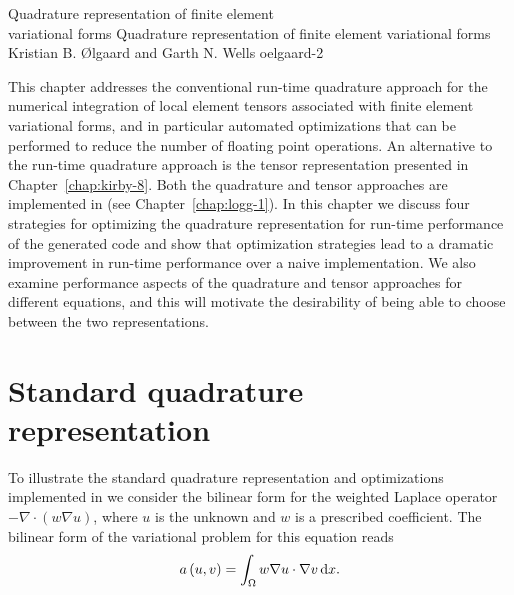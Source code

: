 \setcounter{chapter}{6}
              {Quadrature representation of finite element \\ variational forms}
              {Quadrature representation of finite element variational forms}
              {Kristian B. \O{}lgaard and Garth N. Wells}
              {oelgaard-2}

This chapter addresses the conventional run-time quadrature approach
for the numerical integration of local element tensors associated with
finite element variational forms, and in particular automated
optimizations that can be performed to reduce the number of floating
point operations. An alternative to the run-time quadrature approach
is the tensor representation presented in Chapter~\ref{chap:kirby-8}.
Both the quadrature and tensor approaches are implemented in \ffc{}
(see Chapter~\ref{chap:logg-1}).  In this chapter we discuss four
strategies for optimizing the quadrature representation for run-time
performance of the generated code and show that optimization
strategies lead to a dramatic improvement in run-time performance over
a naive implementation.  We also examine performance aspects of the
quadrature and tensor approaches for different equations, and this
will motivate the desirability of being able to choose between the two
representations.

\section{Standard quadrature representation}
\label{oelgaard-2:sec:standard_quadrature_representation}

To illustrate the standard quadrature representation  and optimizations implemented in \ffc{} we consider
the bilinear form for the weighted Laplace operator $-\nabla \cdot (w
\nabla u)$, where $u$ is the unknown and $w$ is a prescribed
coefficient.  The bilinear form of the variational problem for this
equation reads
%
\begin{equation}
  a\left( {u, v} \right) = \int_{\Omega} w \nabla u \cdot \nabla v \, \mathrm{d}x.
  \label{oelgaard-2:eq:weightedlaplacian}
\end{equation}

